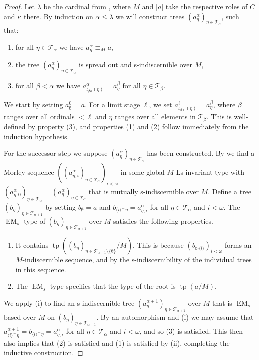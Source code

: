 \documentclass[a4paper, reqno]{amsart}
\theoremstyle{definition}
\theoremstyle{repeat}
\newcommand{\T}{\mathcal{T}}
\DeclareMathOperator{\tp}{tp}
\DeclareMathOperator{\EM}{EM}
\begin{document}
\begin{proof}
Let $\lambda$ be the cardinal from , where $M$ and $|a|$ take the respective roles of $C$ and $\kappa$ there. By induction on $\alpha \leq \lambda$ we will construct trees $(a^\alpha_\eta)_{\eta \in \T_\alpha}$, such that:
\begin{enumerate}
\item for all $\eta \in \T_\alpha$ we have $a^\alpha_\eta \equiv_M a$,
\item the tree $(a^\alpha_\eta)_{\eta \in \T_\alpha}$ is spread out and s-indiscernible over $M$,
\item for all $\beta < \alpha$ we have $a^\alpha_{\iota_{\beta \alpha}(\eta)} = a^\beta_\eta$ for all $\eta \in \T_\beta$.
\end{enumerate}
We start by setting $a^0_\emptyset = a$. For a limit stage $\ell$, we set $a^\ell_{\iota_{\beta \ell}(\eta)} = a^\beta_\eta$, where $\beta$ ranges over all ordinals $< \ell$ and $\eta$ ranges over all elements in $\T_\beta$. This is well-defined by property (3), and properties (1) and (2) follow immediately from the induction hypothesis.

For the successor step we suppose $(a^\alpha_\eta)_{\eta \in \T_\alpha}$ has been constructed. By  we find a Morley sequence $((a^\alpha_{\eta,i})_{\eta \in \T_\alpha})_{i < \omega}$ in some global $M$-Ls-invariant type with $(a^\alpha_{\eta,0})_{\eta \in \T_\alpha} = (a^\alpha_\eta)_{\eta \in \T_\alpha}$ that is mutually s-indiscernible over $M$. Define a tree $(b_\eta)_{\eta \in \T_{\alpha+1}}$ by setting $b_\emptyset = a$ and $b_{\langle i \rangle^\frown \eta} = a^\alpha_{\eta,i}$ for all $\eta \in \T_\alpha$ and $i < \omega$. The $\EM_s$-type of $(b_\eta)_{\eta \in \T_{\alpha+1}}$ over $M$ satisfies the following properties.
\begin{enumerate}[label=(\roman*)]
\item It contains $\tp((b_\eta)_{\eta \in \T_{\alpha+1} \setminus \{\emptyset\}}/M)$. This is because $(b_{\rhd \langle i \rangle})_{i < \omega}$ forms an $M$-indiscernible sequence, and by the s-indiscernibility of the individual trees in this sequence.
\item The $\EM_s$-type specifies that the type of the root is $\tp(a/M)$.
\end{enumerate}
We apply (i) to find an s-indiscernible tree $(a^{\alpha+1}_\eta)_{\eta \in \T_{\alpha+1}}$ over $M$ that is $\EM_s$-based over $M$ on $(b_\eta)_{\eta \in \T_{\alpha+1}}$. By an automorphism and (i) we may assume that $a^{\alpha+1}_{\langle i \rangle^\frown \eta} = b_{\langle i \rangle^\frown \eta} = a^\alpha_{\eta,i}$ for all $\eta \in \T_\alpha$ and $i < \omega$, and so (3) is satisfied. This then also implies that (2) is satisfied and (1) is satisfied by (ii), completing the inductive construction.


\end{proof}
\end{document}
